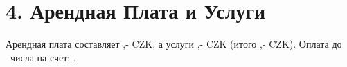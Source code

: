 \section*{4. Арендная Плата и Услуги}
Арендная плата составляет \Rentrentamount,- CZK, а услуги \Rentservicesamount,- CZK (итого \Renttotalamount,- CZK). Оплата до \Rentpaymentday\ числа на счет: \Rentbankaccount.
